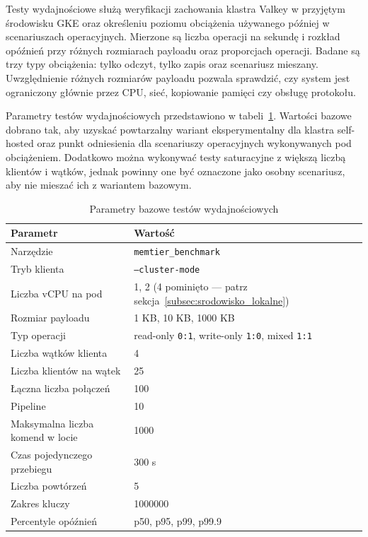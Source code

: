 Testy wydajnościowe służą weryfikacji zachowania klastra Valkey w przyjętym środowisku GKE oraz określeniu poziomu obciążenia używanego później w scenariuszach operacyjnych. Mierzone są liczba operacji na sekundę i rozkład opóźnień przy różnych rozmiarach payloadu oraz proporcjach operacji. Badane są trzy typy obciążenia: tylko odczyt, tylko zapis oraz scenariusz mieszany. Uwzględnienie różnych rozmiarów payloadu pozwala sprawdzić, czy system jest ograniczony głównie przez CPU, sieć, kopiowanie pamięci czy obsługę protokołu.

Parametry testów wydajnościowych przedstawiono w tabeli~\ref{tab:parametry_wydajnosci}. Wartości bazowe dobrano tak, aby uzyskać powtarzalny wariant eksperymentalny dla klastra self-hosted oraz punkt odniesienia dla scenariuszy operacyjnych wykonywanych pod obciążeniem. Dodatkowo można wykonywać testy saturacyjne z większą liczbą klientów i wątków, jednak powinny one być oznaczone jako osobny scenariusz, aby nie mieszać ich z wariantem bazowym.

\begin{table}[H]
\centering
\caption{Parametry bazowe testów wydajnościowych}
\label{tab:parametry_wydajnosci}
\begin{tabularx}{\textwidth}{p{4.6cm}X}
\toprule
\textbf{Parametr} & \textbf{Wartość} \\
\midrule
Narzędzie & \texttt{memtier\_benchmark} \\
Tryb klienta & \texttt{--cluster-mode} \\
Liczba vCPU na pod & 1, 2 (4 pominięto --- patrz sekcja~\ref{subsec:srodowisko_lokalne}) \\
Rozmiar payloadu & 1 KB, 10 KB, 1000 KB \\
Typ operacji & read-only \texttt{0:1}, write-only \texttt{1:0}, mixed \texttt{1:1} \\
Liczba wątków klienta & 4 \\
Liczba klientów na wątek & 25 \\
Łączna liczba połączeń & 100 \\
Pipeline & 10 \\
Maksymalna liczba komend w locie & 1000 \\
Czas pojedynczego przebiegu & 300 s \\
Liczba powtórzeń & 5 \\
Zakres kluczy & 1000000 \\
Percentyle opóźnień & p50, p95, p99, p99.9 \\
\bottomrule
\end{tabularx}
\end{table}

